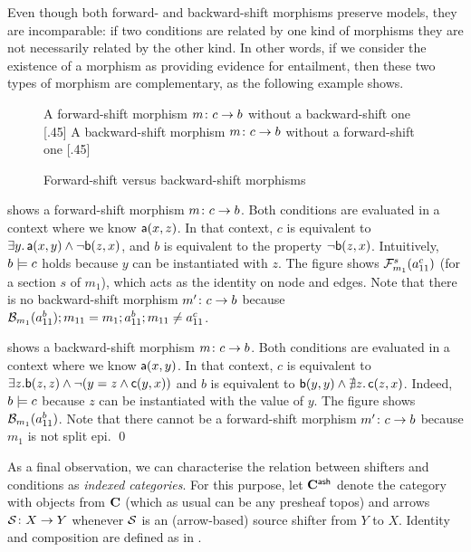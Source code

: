 \medskip\noindent
Even though both forward- and backward-shift morphisms preserve models, they are incomparable: if two conditions are related by one kind of morphisms they are not necessarily related by the other kind. In other words, if we consider the existence of a morphism as providing evidence for entailment, then these two types of morphism are complementary, as the following example shows.
%
\begin{figure}[t]
\centering
\subcaptionbox
  {A forward-shift morphism $m \colon c \rightarrow b$ without a backward-shift one
  }
  [.45\textwidth]
  {}
  \qquad
\subcaptionbox
  {A backward-shift morphism $m \colon c \rightarrow b$ without a forward-shift one
  }
  [.45\textwidth]
  {}
\caption{Forward-shift versus backward-shift morphisms}
\end{figure}
%
\begin{example}
 shows a forward-shift morphism $m \colon c \rightarrow b$. 
Both conditions are evaluated in a context where we know $\mathsf{a}(x,z)$. In that context,  $c$ is equivalent to $\exists y.\, \mathsf{a}(x,y) \wedge \neg \mathsf{b}(z,x)$, and $b$ is equivalent to the property $\neg \mathsf{b}(z,x)$. Intuitively, $b\models c$ holds because $y$ can be instantiated with $z$. The figure shows $\mathcal{F}_{m_1}^s(a^c_{11})$ (for a section $s$ of $m_1$), which acts as the identity on node and edges. Note that there is no backward-shift morphism $m'\colon c \rightarrow b$ because $\mathcal{B}_{m_1}(a^b_{11}) ; m_{11} = m_1; a^b_{11} ; m_{11} \not = a^c_{11}$.

 shows a backward-shift morphism $m \colon c \rightarrow b$. 
Both conditions are evaluated in a context where we know $\mathsf{a}(x,y)$. In that context, $c$ is equivalent to $\exists z.\mathsf{b}(z,z) \wedge \neg(y=z \wedge \mathsf{c}(y,x))$ and $b$ is equivalent to $\mathsf{b}(y,y) \wedge \nexists z.\, \mathsf{c}(z,x)$.
Indeed, $b\models c$ because $z$ can be instantiated with the value of $y$. The figure shows $\mathcal{B}_{m_1}(a^b_{11})$. Note that there cannot be a forward-shift morphism $m'\colon c \rightarrow b$ because $m_1$ is not split epi.
\qed
\end{example}
%
As a final observation, we can characterise the relation between shifters and conditions as \emph{indexed categories}. For this purpose, let $\mathbf{C}^{\mathsf{ash}}$ denote the category with objects from $\mathbf{C}$ (which as usual can be any presheaf topos) and arrows $\mathcal{S}\colon X\rightarrow Y$ whenever $\mathcal{S}$ is an (arrow-based) source shifter from $Y$ to $X$. Identity and composition are defined as in .

